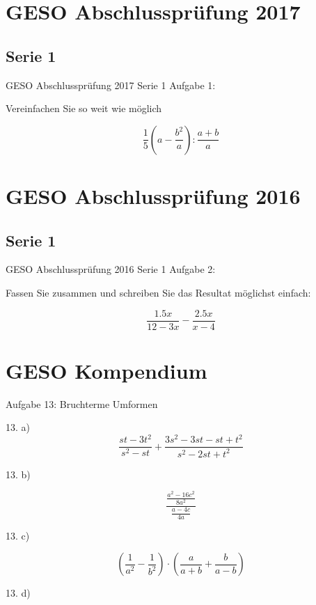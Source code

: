 \section*{GESO Abschlussprüfung 2017}
\subsection*{Serie 1}
GESO Abschlussprüfung 2017 Serie 1 Aufgabe 1:

Vereinfachen Sie so weit wie möglich

$$\frac15\left( a - \frac{b^2}{a} \right) : \frac{a+b}{a}$$


\section*{GESO Abschlussprüfung 2016}
\subsection*{Serie 1}
GESO Abschlussprüfung 2016 Serie 1 Aufgabe 2:

Fassen Sie zusammen und schreiben Sie das Resultat möglichst einfach:

$$\frac{1.5x}{12-3x} - \frac{2.5x}{x-4}$$

\newpage
\section*{GESO Kompendium}

Aufgabe 13: Bruchterme Umformen

13. a)
$$\frac{st-3t^2}{s^2-st} + \frac{3s^2-3st-st+t^2}{s^2-2st+t^2}$$


13. b)

$$\frac{\frac{a^2-16c^2}{8a^2}}{\frac{a-4c}{4a}}$$


13. c)

$$\left(\frac1{a^2} - \frac1{b^2} \right) \cdot{} \left( \frac{a}{a+b} + \frac{b}{a-b}\right)$$


13. d)

